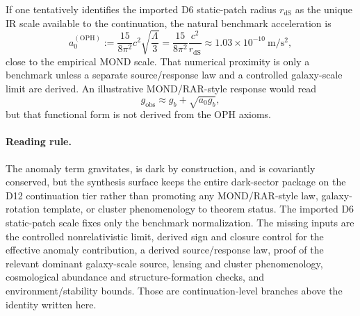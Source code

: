 If one tentatively identifies the imported D6 static-patch radius \(r_{\mathrm{dS}}\) as the
unique IR scale available to the continuation, the natural benchmark acceleration is
\[
a_0^{(\mathrm{OPH})}
:=
\frac{15}{8\pi^2}c^2\sqrt{\frac{\Lambda}{3}}
=
\frac{15}{8\pi^2}\frac{c^2}{r_{\mathrm{dS}}}
\approx
1.03\times 10^{-10}\ \mathrm{m/s^2},
\]
close to the empirical MOND scale. That numerical proximity is only a benchmark unless a separate
source/response law and a controlled galaxy-scale limit are derived. An illustrative MOND/RAR-style response would read
\[
g_{\mathrm{obs}}\approx g_b+\sqrt{a_0 g_b},
\]
but that functional form is not derived from the OPH axioms.

\paragraph{\textbf{Reading rule.}}
The anomaly term gravitates, is dark by construction, and is covariantly conserved, but the
synthesis surface keeps the entire dark-sector package on the D12 continuation tier rather than
promoting any MOND/RAR-style law, galaxy-rotation template, or cluster phenomenology to theorem
status. The imported D6 static-patch scale fixes only the benchmark normalization. The missing
inputs are the controlled nonrelativistic limit, derived sign and closure control for the
effective anomaly contribution, a derived source/response law, proof of the relevant dominant
galaxy-scale source, lensing and cluster phenomenology, cosmological abundance and
structure-formation checks, and environment/stability bounds. Those are continuation-level
branches above the identity written here.
